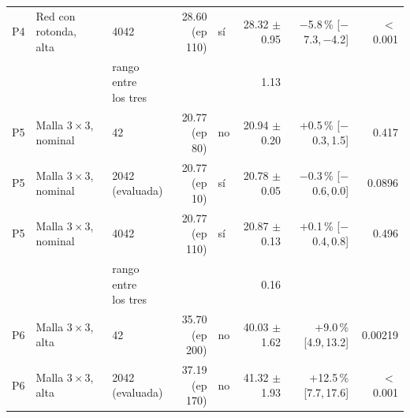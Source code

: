 \begin{table}[H]
\begin{tabular}{lllrlrrr}
P4 & \makecell[l]{Red con rotonda,\\{}alta} & 4042 & \makecell[r]{28.60\\{}(ep 110)} & sí & \makecell[r]{28.32\\{}$\pm$ 0.95} & \makecell[r]{$-$5.8\,\%\\{}[$-$7.3,\,$-$4.2]} & $<$\,0.001 \\
 & & \makecell[l]{rango entre\\{}los tres} & & & 1.13 & & \\
P5 & \makecell[l]{Malla $3 \times 3$,\\{}nominal} & 42 & \makecell[r]{20.77\\{}(ep 80)} & no & \makecell[r]{20.94\\{}$\pm$ 0.20} & \makecell[r]{+0.5\,\%\\{}[$-$0.3,\,1.5]} & 0.417 \\
P5 & \makecell[l]{Malla $3 \times 3$,\\{}nominal} & \makecell[l]{2042\\{}(evaluada)} & \makecell[r]{20.77\\{}(ep 10)} & sí & \makecell[r]{20.78\\{}$\pm$ 0.05} & \makecell[r]{$-$0.3\,\%\\{}[$-$0.6,\,0.0]} & 0.0896 \\
P5 & \makecell[l]{Malla $3 \times 3$,\\{}nominal} & 4042 & \makecell[r]{20.77\\{}(ep 110)} & sí & \makecell[r]{20.87\\{}$\pm$ 0.13} & \makecell[r]{+0.1\,\%\\{}[$-$0.4,\,0.8]} & 0.496 \\
 & & \makecell[l]{rango entre\\{}los tres} & & & 0.16 & & \\
P6 & \makecell[l]{Malla $3 \times 3$,\\{}alta} & 42 & \makecell[r]{35.70\\{}(ep 200)} & no & \makecell[r]{40.03\\{}$\pm$ 1.62} & \makecell[r]{+9.0\,\%\\{}[4.9,\,13.2]} & 0.00219 \\
P6 & \makecell[l]{Malla $3 \times 3$,\\{}alta} & \makecell[l]{2042\\{}(evaluada)} & \makecell[r]{37.19\\{}(ep 170)} & no & \makecell[r]{41.32\\{}$\pm$ 1.93} & \makecell[r]{+12.5\,\%\\{}[7.7,\,17.6]} & $<$\,0.001 \\

\end{tabular}
\end{table}
